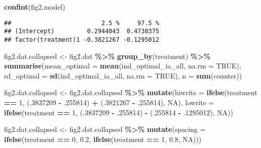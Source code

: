 \documentclass[
]{article}
\newenvironment{Shaded}{\begin{snugshade}}{\end{snugshade}}
\newcommand{\AttributeTok}[1]{\textcolor[rgb]{0.13,0.29,0.53}{#1}}
\newcommand{\ConstantTok}[1]{\textcolor[rgb]{0.56,0.35,0.01}{#1}}
\newcommand{\DecValTok}[1]{\textcolor[rgb]{0.00,0.00,0.81}{#1}}
\newcommand{\FloatTok}[1]{\textcolor[rgb]{0.00,0.00,0.81}{#1}}
\newcommand{\FunctionTok}[1]{\textcolor[rgb]{0.13,0.29,0.53}{\textbf{#1}}}
\newcommand{\NormalTok}[1]{#1}
\newcommand{\OtherTok}[1]{\textcolor[rgb]{0.56,0.35,0.01}{#1}}
\newcommand{\SpecialCharTok}[1]{\textcolor[rgb]{0.81,0.36,0.00}{\textbf{#1}}}
\begin{document}
\begin{Shaded}
\begin{Highlighting}[]
\FunctionTok{confint}\NormalTok{(fig2.model)}
\end{Highlighting}
\end{Shaded}

\begin{verbatim}
##                         2.5 %     97.5 %
## (Intercept)         0.2944043  0.4730375
## factor(treatment)1 -0.3821267 -0.1295012
\end{verbatim}

\begin{Shaded}
\begin{Highlighting}[]
\NormalTok{fig2.dat.collapsed }\OtherTok{\textless{}{-}}\NormalTok{ fig2.dat }\SpecialCharTok{\%\textgreater{}\%}
  \FunctionTok{group\_by}\NormalTok{(treatment) }\SpecialCharTok{\%\textgreater{}\%}
  \FunctionTok{summarise}\NormalTok{(}\AttributeTok{mean\_optimal =} \FunctionTok{mean}\NormalTok{(ind\_optimal\_ia\_all, }\AttributeTok{na.rm =} \ConstantTok{TRUE}\NormalTok{),}
            \AttributeTok{sd\_optimal =} \FunctionTok{sd}\NormalTok{(ind\_optimal\_ia\_all, }\AttributeTok{na.rm =} \ConstantTok{TRUE}\NormalTok{),}
            \AttributeTok{n =} \FunctionTok{sum}\NormalTok{(counter))}

\NormalTok{fig2.dat.collapsed }\OtherTok{\textless{}{-}}\NormalTok{ fig2.dat.collapsed }\SpecialCharTok{\%\textgreater{}\%}
  \FunctionTok{mutate}\NormalTok{(}\AttributeTok{hiwrite =} \FunctionTok{ifelse}\NormalTok{(treatment }\SpecialCharTok{==} \DecValTok{1}\NormalTok{, (.}\DecValTok{3837209} \SpecialCharTok{{-}}\NormalTok{ .}\DecValTok{255814}\NormalTok{) }\SpecialCharTok{+}\NormalTok{ (.}\DecValTok{3821267} \SpecialCharTok{{-}}\NormalTok{ .}\DecValTok{255814}\NormalTok{), }\ConstantTok{NA}\NormalTok{),}
         \AttributeTok{lowrite =} \FunctionTok{ifelse}\NormalTok{(treatment }\SpecialCharTok{==} \DecValTok{1}\NormalTok{, (.}\DecValTok{3837209} \SpecialCharTok{{-}}\NormalTok{ .}\DecValTok{255814}\NormalTok{) }\SpecialCharTok{{-}}\NormalTok{ (.}\DecValTok{255814} \SpecialCharTok{{-}}\NormalTok{ .}\DecValTok{1295012}\NormalTok{), }\ConstantTok{NA}\NormalTok{))}

\NormalTok{fig2.dat.collapsed }\OtherTok{\textless{}{-}}\NormalTok{ fig2.dat.collapsed }\SpecialCharTok{\%\textgreater{}\%}
  \FunctionTok{mutate}\NormalTok{(}\AttributeTok{spacing =} \FunctionTok{ifelse}\NormalTok{(treatment }\SpecialCharTok{==} \DecValTok{0}\NormalTok{, }\FloatTok{0.2}\NormalTok{, }\FunctionTok{ifelse}\NormalTok{(treatment }\SpecialCharTok{==} \DecValTok{1}\NormalTok{, }\FloatTok{0.8}\NormalTok{, }\ConstantTok{NA}\NormalTok{)))}


\end{Highlighting}
\end{Shaded}
\end{document}
